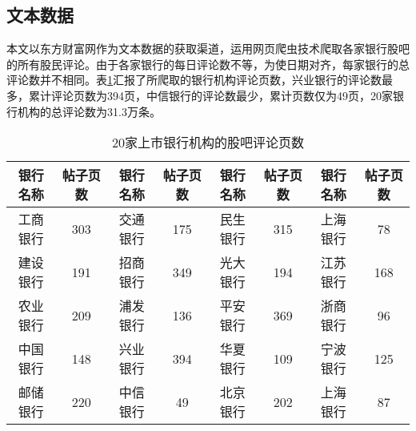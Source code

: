 \documentclass[lang=cn]{elegantpaper}
\begin{document}
\subsection{文本数据}
本文以东方财富网作为文本数据的获取渠道，运用网页爬虫技术爬取各家银行股吧的所有股民评论。由于各家银行的每日评论数不等，为使日期对齐，每家银行的总评论数并不相同。表\ref{表3}汇报了所爬取的银行机构评论页数，兴业银行的评论数最多，累计评论页数为394页，中信银行的评论数最少，累计页数仅为49页，20家银行机构的总评论数为31.3万条。
\begin{table}[htb]
    \centering
    \caption{20家上市银行机构的股吧评论页数}
    \label{表3}
	\begin{tabular*}{\textwidth}{@{}@{\extracolsep{\fill}}cccccccc@{}}
    \toprule
    银行名称 & 帖子页数 & 银行名称 & 帖子页数 & 银行名称 & 帖子页数 & 银行名称 & 帖子页数 \\ \midrule
    工商银行 & 303  & 交通银行 & 175  & 民生银行 & 315  & 上海银行 & 78   \\
    建设银行 & 191  & 招商银行 & 349  & 光大银行 & 194  & 江苏银行 & 168  \\
    农业银行 & 209  & 浦发银行 & 136  & 平安银行 & 369  & 浙商银行 & 96   \\
    中国银行 & 148  & 兴业银行 & 394  & 华夏银行 & 109  & 宁波银行 & 125  \\
    邮储银行 & 220  & 中信银行 & 49   & 北京银行 & 202  & 上海银行 & 87   \\ \bottomrule
    \end{tabular*}
\end{table}
\end{document}

